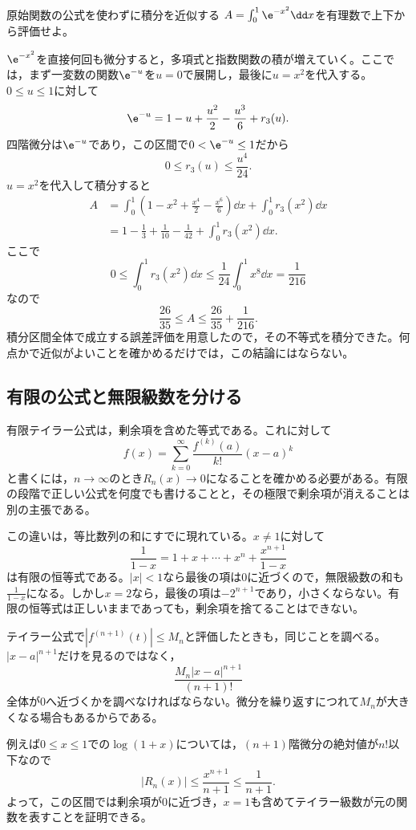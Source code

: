 \begin{example}{原始関数の公式を使わずに積分を近似する}
$A=\int_0^1\e^{-x^2}\dd x$を有理数で上下から評価せよ。
\end{example}

$\e^{-x^2}$を直接何回も微分すると，多項式と指数関数の積が増えていく。ここでは，まず一変数の関数$\e^{-u}$を$u=0$で展開し，最後に$u=x^2$を代入する。$0\leq u\leq1$に対して
\[
 \e^{-u}=1-u+\frac{u^2}{2}-\frac{u^3}{6}+r_3(u).
\]
四階微分は$\e^{-u}$であり，この区間で$0<\e^{-u}\leq1$だから
\[
 0\leq r_3(u)\leq\frac{u^4}{24}.
\]
$u=x^2$を代入して積分すると
\[
\begin{aligned}
 A&=\int_0^1\left(1-x^2+\frac{x^4}{2}-\frac{x^6}{6}\right)\dd x
       +\int_0^1r_3(x^2)\dd x\\
  &=1-\frac13+\frac1{10}-\frac1{42}
       +\int_0^1r_3(x^2)\dd x.
\end{aligned}
\]
ここで
\[
 0\leq\int_0^1r_3(x^2)\dd x
 \leq\frac1{24}\int_0^1x^8\dd x=\frac1{216}
\]
なので
\[
 \boxed{\frac{26}{35}\leq A\leq\frac{26}{35}+\frac1{216}}.
\]
積分区間全体で成立する誤差評価を用意したので，その不等式を積分できた。何点かで近似がよいことを確かめるだけでは，この結論にはならない。

\subsection{有限の公式と無限級数を分ける}

有限テイラー公式は，剰余項を含めた等式である。これに対して
\[
 f(x)=\sum_{k=0}^{\infty}\frac{f^{(k)}(a)}{k!}(x-a)^k
\]
と書くには，$n\to\infty$のとき$R_n(x)\to0$になることを確かめる必要がある。有限の段階で正しい公式を何度でも書けることと，その極限で剰余項が消えることは別の主張である。

この違いは，等比数列の和にすでに現れている。$x\ne1$に対して
\[
 \frac1{1-x}=1+x+\cdots+x^n+\frac{x^{n+1}}{1-x}
\]
は有限の恒等式である。$|x|<1$なら最後の項は$0$に近づくので，無限級数の和も$\frac1{1-x}$になる。しかし$x=2$なら，最後の項は$-2^{n+1}$であり，小さくならない。有限の恒等式は正しいままであっても，剰余項を捨てることはできない。

テイラー公式で$|f^{(n+1)}(t)|\leq M_n$と評価したときも，同じことを調べる。$|x-a|^{n+1}$だけを見るのではなく，
\[
 \frac{M_n|x-a|^{n+1}}{(n+1)!}
\]
全体が$0$へ近づくかを調べなければならない。微分を繰り返すにつれて$M_n$が大きくなる場合もあるからである。

例えば$0\leq x\leq1$での$\log(1+x)$については，$(n+1)$階微分の絶対値が$n!$以下なので
\[
 |R_n(x)|\leq\frac{x^{n+1}}{n+1}\leq\frac1{n+1}.
\]
よって，この区間では剰余項が$0$に近づき，$x=1$も含めてテイラー級数が元の関数を表すことを証明できる。

